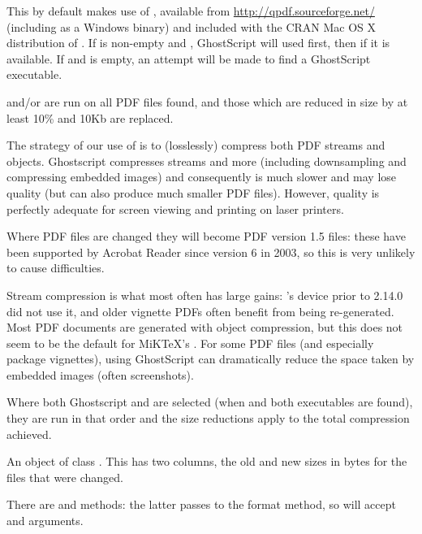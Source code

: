 %
\begin{Details}\relax
This by default makes use of , available from
\url{http://qpdf.sourceforge.net/} (including as a Windows binary) and
included with the CRAN Mac OS X distribution of \R{}.  If 
is non-empty and , GhostScript will used
first, then  if it is available.  If  and  is empty, an attempt will be made to find a
GhostScript executable.

 and/or  are run on all PDF files found,
and those which are reduced in size by at least 10\% and 10Kb are
replaced.

The strategy of our use of  is to (losslessly) compress
both PDF streams and objects.  Ghostscript compresses streams and more
(including downsampling and compressing embedded images) and
consequently is much slower and may lose quality (but can also produce
much smaller PDF files).  However, quality  is perfectly
adequate for screen viewing and printing on laser printers.

Where PDF files are changed they will become PDF version 1.5 files:
these have been supported by Acrobat Reader since version 6 in 2003,
so this is very unlikely to cause difficulties.

Stream compression is what most often has large gains: \R{}'s
 device prior to \R{} 2.14.0 did not use it, and
older vignette PDFs often benefit from being re-generated.  Most PDF
documents are generated with object compression, but this does not
seem to be the default for MiKTeX's .  For some PDF
files (and especially package vignettes), using GhostScript can
dramatically reduce the space taken by embedded images (often screenshots).

Where both Ghostscript and  are selected (when
 and both executables are found), they are
run in that order and the size reductions apply to the total
compression achieved.
\end{Details}
%
\begin{Value}
An object of class .
This has two columns, the old and new sizes in bytes for the files
that were changed.

There are  and  methods: the latter passes
 to the format method, so will accept  and
 arguments.
\end{Value}
